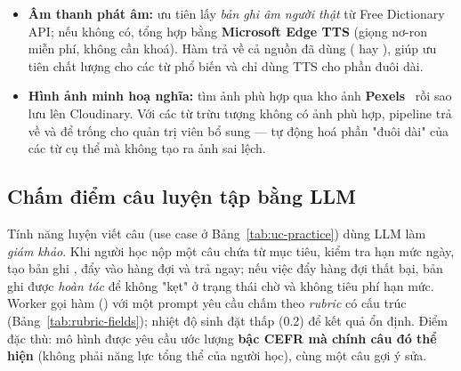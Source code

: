 \begin{itemize}
  \item \textbf{Âm thanh phát âm:} ưu tiên lấy \textit{bản ghi âm người thật}
        từ Free Dictionary API; nếu không có, tổng hợp bằng \textbf{Microsoft
        Edge TTS} (giọng nơ-ron miễn phí, không cần khoá). Hàm trả về cả nguồn
        đã dùng ( hay ), giúp ưu tiên chất lượng cho
        các từ phổ biến và chỉ dùng TTS cho phần đuôi dài.
  \item \textbf{Hình ảnh minh hoạ nghĩa:} tìm ảnh phù hợp qua kho ảnh
        \textbf{Pexels}~\cite{pexels2024} rồi sao lưu lên Cloudinary. Với các
        từ trừu tượng không có ảnh phù hợp, pipeline trả về  và để
        trống cho quản trị viên bổ sung --- tự động hoá phần "đuôi dài" của
        các từ cụ thể mà không tạo ra ảnh sai lệch.
\end{itemize}

\subsection{Chấm điểm câu luyện tập bằng LLM}
\label{subsec:impl-judge}

Tính năng luyện viết câu (use case ở Bảng~\ref{tab:uc-practice}) dùng LLM làm
\textit{giám khảo}. Khi người học nộp một câu chứa từ mục tiêu,
 kiểm tra hạn mức ngày, tạo bản ghi , đẩy
vào hàng đợi và trả  ngay; nếu việc đẩy hàng đợi thất bại, bản ghi
được \textit{hoàn tác} để không "kẹt" ở trạng thái chờ và không tiêu phí hạn
mức. Worker  gọi hàm 
() với một prompt yêu cầu chấm theo \textit{rubric} có
cấu trúc (Bảng~\ref{tab:rubric-fields}); nhiệt độ sinh đặt thấp (0.2) để kết
quả ổn định. Điểm đặc thù: mô hình được yêu cầu ước lượng
\textbf{bậc CEFR mà chính câu đó thể hiện} (không phải năng lực tổng thể của
người học), cùng một câu gợi ý sửa.

